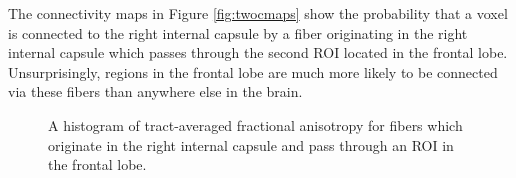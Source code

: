 The connectivity maps in Figure \ref{fig:twocmaps} show the probability that a voxel is connected to the right internal capsule by a fiber originating in the right internal capsule which passes through the second ROI located in the frontal lobe.  Unsurprisingly, regions in the frontal lobe are much more likely to be connected via these fibers than anywhere else in the brain.

\begin{figure}
	\caption{A histogram of tract-averaged fractional anisotropy for fibers which originate in the right internal capsule and pass through an ROI in the frontal lobe.}
	\label{fig:twoFAhistograms}
\end{figure}

